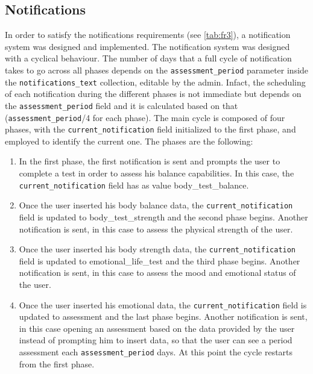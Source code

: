 \subsection{Notifications}
\label{subsec:notifications}
In order to satisfy the notifications requirements (see \cref{tab:fr3}), a notification system was designed and implemented. The notification system was designed with a cyclical behaviour. 
\newline The number of days that a full cycle of notification takes to go across all phases depends on the \texttt{assessment\_period} parameter inside the \texttt{notifications\_text} collection, editable by the admin. Infact, the scheduling of each notification during the different phases is not immediate but depends on the \texttt{assessment\_period} field and it is calculated based on that (\texttt{assessment\_period}/4 for each phase).  
\newline The main cycle is composed of four phases, with the \texttt{current\_notification} field initialized to the first phase, and employed to identify the current one. The phases are the following:
\begin{enumerate}[nosep] %
    \item In the first phase, the first notification is sent and prompts the user to complete a test in order to assess his balance capabilities. In this case, the \texttt{current\_notification} field has as value body\_test\_balance.
    \item Once the user inserted his body balance data, the \texttt{current\_notification} field is updated to body\_test\_strength and the second phase begins. Another notification is sent, in this case to assess the physical strength of the user. 
    \item Once the user inserted his body strength data, the \texttt{current\_notification} field is updated to emotional\_life\_test and the third phase begins. Another notification is sent, in this case to assess the mood and emotional status of the user.
    \item Once the user inserted his emotional data, the \texttt{current\_notification} field is updated to assessment and the last phase begins. Another notification is sent, in this case opening an assessment based on the data provided by the user instead of prompting him to insert data, so that the user can see a period assessment each \texttt{assessment\_period} days. At this point the cycle restarts from the first phase.
\end{enumerate}

